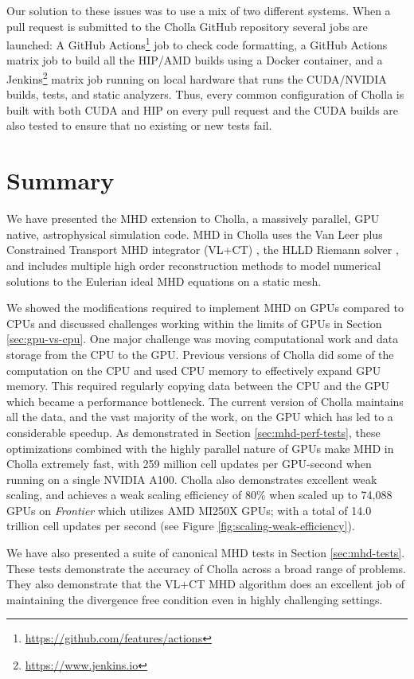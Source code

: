 \documentclass[modern, linenumbers]{aastex631}
\begin{document}
Our solution to these issues was to use a mix of two different systems. When a pull request is submitted to the Cholla GitHub repository several jobs are launched: A GitHub Actions\footnote{\url{https://github.com/features/actions}} job to check code formatting, a GitHub Actions matrix job to build all the HIP/AMD builds using a Docker container, and a Jenkins\footnote{\url{https://www.jenkins.io}} matrix job running on local hardware that runs the CUDA/NVIDIA builds, tests, and static analyzers. Thus, every common configuration of Cholla is built with both CUDA and HIP on every pull request and the CUDA builds are also tested to ensure that no existing or new tests fail.


\section{Summary}
\label{sec:summary}

We have presented the MHD extension to Cholla, a massively parallel, GPU native, astrophysical simulation code. MHD in Cholla uses the Van Leer plus Constrained Transport MHD integrator (VL+CT) \citep{stone_2009}, the HLLD Riemann solver \citep{hlld_2005}, and includes multiple high order reconstruction methods to model numerical solutions to the Eulerian ideal MHD equations on a static mesh.

We showed the modifications required to implement MHD on GPUs compared to CPUs and discussed challenges working within the limits of GPUs in Section \ref{sec:gpu-vs-cpu}. One major challenge was moving computational work and data storage from the CPU to the GPU. Previous versions of Cholla did some of the computation on the CPU and used CPU memory to effectively expand GPU memory. This required regularly copying data between the CPU and the GPU which became a performance bottleneck. The current version of Cholla maintains all the data, and the vast majority of the work, on the GPU which has led to a considerable speedup. As demonstrated in Section \ref{sec:mhd-perf-tests}, these optimizations combined with the highly parallel nature of GPUs make MHD in Cholla extremely fast, with 259 million cell updates per GPU-second when running on a single NVIDIA A100. Cholla also demonstrates excellent weak scaling, and achieves a weak scaling efficiency of 80\% when scaled up to 74,088 GPUs on \textit{Frontier} which utilizes AMD MI250X GPUs; with a total of 14.0 trillion cell updates per second (see Figure \ref{fig:scaling-weak-efficiency}).

We have also presented a suite of canonical MHD tests in Section \ref{sec:mhd-tests}. These tests demonstrate the accuracy of Cholla across a broad range of problems. They also demonstrate that the VL+CT MHD algorithm does an excellent job of maintaining the divergence free condition even in highly challenging settings.
\end{document}
